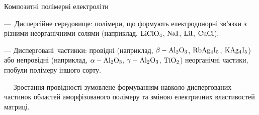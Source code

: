 \documentclass[10pt]{beamer}
\begin{document}
\begin{frame}{Композитні полімерні електроліти}

---~Дисперсійне середовище: полімери, що формують електродонорні зв’язки з різними неорганічними солями  (наприклад, $\rm LiClO_4$, $\rm NaI$, $\rm LiI$, $\rm CuCl$).

--- Дисперговані~частинки: провідні (наприклад, $\rm \beta-Al_2O_3$, $\rm RbAg_4I_5$, $\rm KAg_4I_5$) або непровідні (наприклад, $\rm \alpha-Al_2O_3$,  $\rm \gamma-Al_2O_3$, $\rm TiO_2$) неорганічні частики,
глобули полімеру іншого сорту.


--- Зростання провідності зумовлене формуванням навколо диспергованих частинок областей аморфізованого полімеру та зміною електричних властивостей матриці. 

\end{frame}
\end{document}
